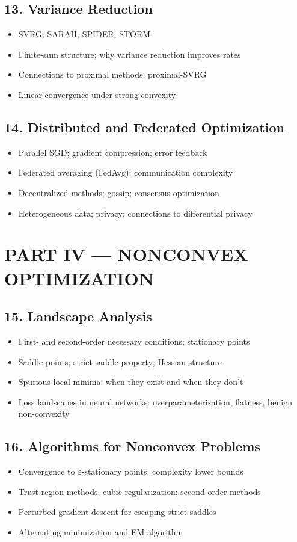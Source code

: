 \subsection{13. Variance Reduction}
\begin{itemize}
\item SVRG; SARAH; SPIDER; STORM
\item Finite-sum structure; why variance reduction improves rates
\item Connections to proximal methods; proximal-SVRG
\item Linear convergence under strong convexity
\end{itemize}

\subsection{14. Distributed and Federated Optimization}
\begin{itemize}
\item Parallel SGD; gradient compression; error feedback
\item Federated averaging (FedAvg); communication complexity
\item Decentralized methods; gossip; consensus optimization
\item Heterogeneous data; privacy; connections to differential privacy
\end{itemize}

\section{PART IV --- NONCONVEX OPTIMIZATION}

\subsection{15. Landscape Analysis}
\begin{itemize}
\item First- and second-order necessary conditions; stationary points
\item Saddle points; strict saddle property; Hessian structure
\item Spurious local minima: when they exist and when they don't
\item Loss landscapes in neural networks: overparameterization, flatness, benign non-convexity
\end{itemize}

\subsection{16. Algorithms for Nonconvex Problems}
\begin{itemize}
\item Convergence to $\varepsilon$-stationary points; complexity lower bounds
\item Trust-region methods; cubic regularization; second-order methods
\item Perturbed gradient descent for escaping strict saddles
\item Alternating minimization and EM algorithm
\end{itemize}

